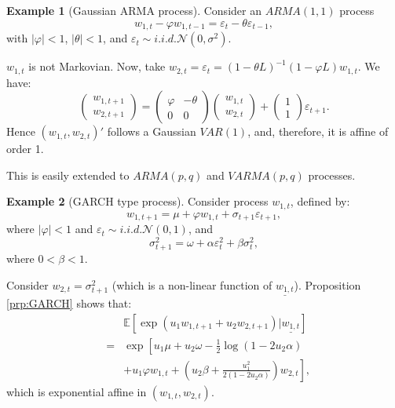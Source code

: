 \documentclass[
  12pt,
]{book}
\theoremstyle{definition}
\theoremstyle{definition}
\newtheorem{example}{Example}[chapter]
\theoremstyle{definition}
\theoremstyle{definition}
\theoremstyle{remark}
\begin{document}
\begin{example}[Gaussian ARMA process]
\protect\hypertarget{exm:GaussianARMA}{}\label{exm:GaussianARMA}Consider an \(ARMA(1,1)\) process
\[
w_{1,t} - \varphi w_{1,t-1} = \varepsilon_t-\theta \varepsilon_{t-1},
\]
with \(|\varphi | < 1\), \(|\theta| < 1\), and \(\varepsilon_t \sim i.i.d. \mathcal{N}(0, \sigma^2)\).

\(w_{1,t}\) is not Markovian. Now, take \(w_{2,t} = \varepsilon_t = (1-\theta L)^{-1}(1-\varphi L)w_{1,t}\). We have:
\[
\left(
\begin{array}{l}
w_{1,t+1} \\
w_{2,t+1}
\end{array}
\right) =
\left(
\begin{array}{ll}
\varphi & -\theta \\
0 &      0
\end{array}
\right)
\left(
\begin{array}{l}
w_{1,t} \\
w_{2,t}
\end{array}
\right) +
\left(
\begin{array}{l}
1 \\
1
\end{array}
\right) \varepsilon_{t+1}.
\]
Hence \((w_{1,t}, w_{2,t})'\) follows a Gaussian \(VAR(1)\), and, therefore, it is affine of order 1.

This is easily extended to \(ARMA(p,q)\) and \(VARMA(p,q)\) processes.
\end{example}

\begin{example}[GARCH type process]
\protect\hypertarget{exm:GARCH}{}\label{exm:GARCH}Consider process \(w_{1,t}\), defined by:
\[
w_{1,t+1}  = \mu + \varphi w_{1,t} + \sigma_{t+1} \varepsilon_{t+1},
\]
where \(|\varphi| < 1\) and \(\varepsilon_t \sim i.i.d. \mathcal{N}(0,1)\), and
\[
\sigma^2_{t+1} = \omega + \alpha \varepsilon^2_t + \beta \sigma^2_t,
\]
where \(0 < \beta < 1\).

Consider \(w_{2,t} = \sigma^2_{t+1}\) (which is a non-linear function of \(\underline{w_{1,t}}\)). Proposition \ref{prp:GARCH} shows that:
\begin{eqnarray*}
&& \mathbb{E}\left[\exp(u_1 w_{1,t+1} + u_2 w_{2,t+1})|\underline{w_{1,t}}\right] \\
&=& \exp\left[u_1 \mu + u_2 \omega - \frac{1}{2}   \log(1-2 u_2 \alpha) \right. \\
&&\left. +  u_1 \varphi w_{1,t} + (u_2\beta +  \frac{u^2_1}{2(1-2u_2\alpha)}) w_{2,t}\right],
\end{eqnarray*}
which is exponential affine in \((w_{1,t}, w_{2,t})\).
\end{example}
\end{document}
